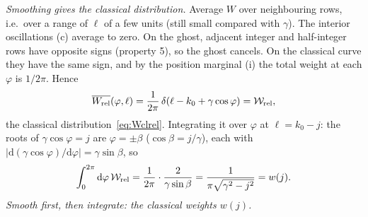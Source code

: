 \documentclass[aps,pra,onecolumn,notitlepage,nofootinbib,11pt]{revtex4-2}
\newcommand{\dd}{\mathrm{d}}
\newcommand{\Wc}{\mathcal{W}}
\begin{document}
\emph{Smoothing gives the classical distribution.} Average $W$ over neighbouring rows,
i.e.\ over a range of $\ell$ of a few units (still small compared with $\gamma$). The
interior oscillations (c) average to zero. On the ghost, adjacent integer and
half-integer rows have opposite signs (property 5), so the ghost cancels. On the
classical curve they have the same sign, and by the position marginal (i) the total
weight at each $\varphi$ is $1/2\pi$. Hence
\begin{equation}
\overline{W_{\rm rel}}(\varphi,\ell)=\frac{1}{2\pi}\,\delta(\ell-k_{0}+\gamma\cos\varphi)=\Wc_{\rm rel},
\end{equation}
the classical distribution~\eqref{eq:Wclrel}. Integrating it over $\varphi$ at
$\ell=k_{0}-j$: the roots of $\gamma\cos\varphi=j$ are $\varphi=\pm\beta$ ($\cos\beta=j/\gamma$), each
with $|\dd(\gamma\cos\varphi)/\dd\varphi|=\gamma\sin\beta$, so
\begin{equation}
\int_{0}^{2\pi}\dd\varphi\,\Wc_{\rm rel}=\frac{1}{2\pi}\cdot\frac{2}{\gamma\sin\beta}
=\frac{1}{\pi\sqrt{\gamma^{2}-j^{2}}}=w(j).
\end{equation}
\emph{Smooth first, then integrate: the classical weights $w(j)$.}
\end{document}
